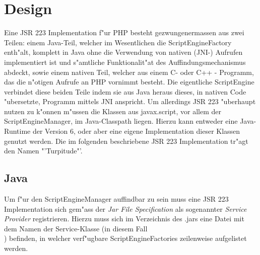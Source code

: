 \section{Design}
\label{sec:chap1:design}

Eine JSR 223 Implementation f"ur PHP besteht gezwungenermassen aus zwei Teilen: einem Java-Teil, welcher im Wesentlichen
die ScriptEngineFactory enth"alt, komplett in Java ohne die Verwendung von nativen (JNI-) Aufrufen implementiert ist und
s"amtliche Funktionalit"at des Auffindungsmechanismus abdeckt, sowie einem nativen Teil, welcher aus 
einem C- oder C++ - Programm, das die n"otigen Aufrufe an PHP vornimmt besteht.
Die eigentliche ScriptEngine verbindet diese beiden Teile indem sie aus Java heraus dieses, in nativen Code "ubersetzte, 
Programm mittels JNI anspricht.
Um allerdings JSR 223 "uberhaupt nutzen zu k"onnen m"ussen die Klassen aus javax.script, vor allem der ScriptEngineManager, 
im Java-Classpath liegen. Hierzu kann entweder eine Java-Runtime der Version 6, oder aber eine eigene Implementation dieser
Klassen genutzt werden. 
Die im folgenden beschriebene JSR 223 Implementation tr"agt den Namen "'Turpitude"'.

\subsection{Java}
\label{sec:chap1:design:java}

Um f"ur den ScriptEngineManager auffindbar zu sein muss eine JSR 223 Implementation sich gem"ass der \emph{Jar File Specification} \cite{JARSPEC} 
als sogenannter \emph{Service Provider} registrieren. Hierzu muss sich im Verzeichnis  des .jars eine Datei
mit dem Namen der Service-Klasse (in diesem Fall \\
) befinden, in welcher verf"ugbare 
ScriptEngineFactories zeilenweise aufgelistet werden.

